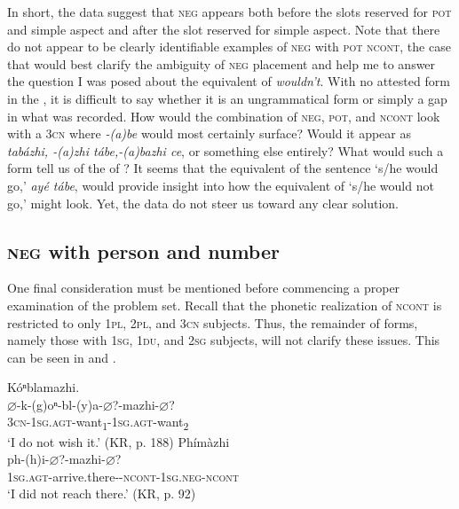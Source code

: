 \documentclass[output=paper]{LSP/langsci}
\begin{document}
In short, the data suggest that \textsc{neg} appears both before the slots reserved for \textsc{pot} and simple aspect and after the slot reserved for simple aspect. Note that there do not appear to be clearly identifiable examples of \textsc{neg} with \textsc{pot ncont}, the case that would best clarify the ambiguity of  \textsc{neg} placement and help me to answer the question I was posed about the  equivalent of \textit{wouldn't}. With no attested form in the , it is difficult to say whether it is an ungrammatical form or simply a gap in what was recorded. How would the combination of \textsc{neg}, \textsc{pot}, and \textsc{ncont} look with a \textsc{3cn}  where \textit{-(a)be} would most certainly surface? Would it appear as \textit{tabázhi, -(a)zhi tábe,-(a)bazhi ce}, or something else entirely? What would such a form tell us of the  of  ? It seems that the  equivalent of the  sentence `s/he would go,' \textit{ay\'e tábe}, would provide insight into how the equivalent of `s/he would not go,' might look. Yet, the data do not steer us toward any clear solution.

\subsection{\textsc{neg} with person and number}
One final consideration must be mentioned before commencing a proper examination of the problem set. Recall that the phonetic realization of \textsc{ncont} is restricted to only \textsc{1pl, 2pl}, and \textsc{3cn} subjects. Thus, the remainder of forms, namely those with \textsc{1sg, 1du}, and \textsc{2sg} subjects, will not clarify these issues. This can be seen in  and .

\ea \label{ambiguity}
  \ea \label{ambiguity1} 
  Kóⁿblamazhi.\\
  \gll $\varnothing$-k-(g)oⁿ-bl-(y)a-$\varnothing$?-mazhi-$\varnothing$? \\
  \textsc{3cn-1sg.agt}-want\textsubscript{1}-\textsc{1sg.agt}-want\textsubscript{2} \\ 
  \glt `I do not wish it.' (KR, p. 188)  
  \ex \label{ambiguity2} 
  Phímàzhi\\
  \gll ph-(h)i-$\varnothing$?-mazhi-$\varnothing$?  \\
  \textsc{1sg.agt}-arrive.there-\textsc{-ncont}-\textsc{1sg.neg}-\textsc{ncont} \\
  \glt `I did not reach there.' (KR, p. 92) 
  \z 
\z 
\end{document}

